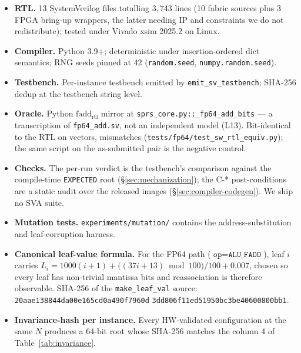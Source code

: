 \documentclass[journal,10pt]{IEEEtran}
\theoremstyle{plain}
\theoremstyle{definition}
\theoremstyle{remark}
\newcommand{\fadd}{\ensuremath{\mathrm{fadd}_{\mathrm{rtl}}}}
\newcommand{\sv}[1]{\texttt{#1}}
\begin{document}
\begin{itemize}
\item \textbf{RTL.} 13 SystemVerilog files totalling $3{,}743$ lines
      (10 fabric sources plus 3 FPGA bring-up wrappers, the latter needing
      IP and constraints we do not redistribute); tested under Vivado xsim
      2025.2 on Linux.
\item \textbf{Compiler.} Python 3.9+; deterministic under insertion-ordered
      dict semantics; RNG seeds pinned at $42$ (\sv{random.seed},
      \sv{numpy.random.seed}).
\item \textbf{Testbench.} Per-instance testbench emitted by
      \sv{emit\_sv\_testbench}; SHA-256 dedup at the testbench string
      level.
\item \textbf{Oracle.} Python $\fadd$ mirror at
      \sv{sprs\_core.py::\_fp64\_add\_bits} --- a transcription of
      \sv{fp64\_add.sv}, not an independent model (L13). Bit-identical to the
      RTL on \FpAcceptVectors{} vectors, \FpAcceptMismatch{} mismatches
      (\sv{tests/fp64/test\_sw\_rtl\_equiv.py}); the same script on the
      as-submitted pair is the negative control.
\item \textbf{Checks.} The per-run verdict is the testbench's comparison
      against the compile-time \sv{EXPECTED} root
      (\S\ref{sec:mechanization}); the \textsf{C-*} post-conditions are a
      static audit over the released images (\S\ref{sec:compiler-codegen}).
      We ship no SVA suite.
\item \textbf{Mutation tests.} \sv{experiments/mutation/} contains the
      address-substitution and leaf-corruption harness.
\item \textbf{Canonical leaf-value formula.} For the FP64 path
      ($\sv{op} = \sv{ALU\_FADD}$), leaf $i$ carries
      $L_i = 1000(i{+}1) + \bigl((37i{+}13) \bmod 100\bigr)/100 + 0.007$,
      chosen so every leaf has non-trivial mantissa bits and reassociation
      is therefore observable. SHA-256 of the \sv{make\_leaf\_val} source:
      \sv{20aae138844da00e165cd0a490f7960d}\allowbreak
      \sv{3dd806f11ed51950bc3be40600800bb1}.
\item \textbf{Invariance-hash per instance.} Every HW-validated
      configuration at the same $N$ produces a 64-bit root whose
      SHA-256 matches the column 4 of Table~\ref{tab:invariance}.
\end{itemize}



\end{document}
